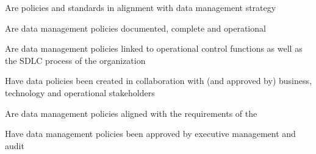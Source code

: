 %
%



\begin{maturity-dimensions}

  \item Are policies and standards in alignment with data management strategy
  \item Are data management policies documented, complete and operational
  \item Are data management policies linked to operational control functions as well as the
        SDLC process of the organization
  \item Have data policies been created in collaboration with (and approved by) business, technology
        and operational stakeholders
  \item Are data management policies aligned with the requirements of the 
  \item Have data management policies been approved by executive management and audit

\end{maturity-dimensions}

